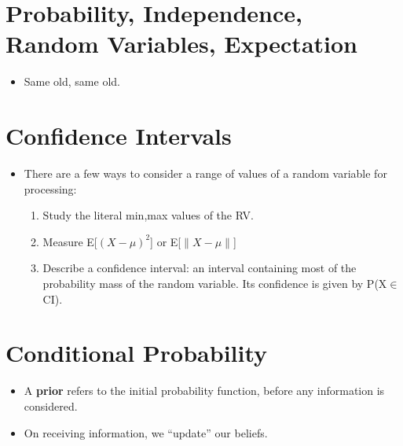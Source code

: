 \documentclass{article}
\begin{document}
\section{Probability, Independence, Random Variables, Expectation}
\begin{itemize}
\item Same old, same old.
\end{itemize}
\section{Confidence Intervals}
\begin{itemize}
\item There are a few ways to consider a range of values of a random variable for processing:
\begin{enumerate}
\item Study the literal min,max values of the RV.
\item Measure E[$(X-\mu)^2$] or E[$\|X-\mu\|$]
\item Describe a confidence interval: an interval containing most of the probability mass of the random variable. Its confidence is given by P(X$\in$ CI).
\end{enumerate}
\end{itemize}
\section{Conditional Probability}
\begin{itemize}
\item A \textbf{prior} refers to the initial probability function, before any information is considered.
\item On receiving information, we ``update'' our beliefs.
\end{itemize}
\end{document}
